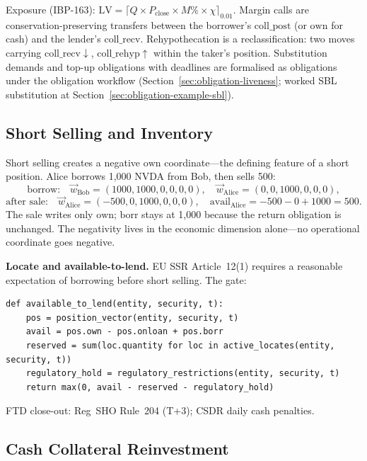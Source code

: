 Exposure (IBP-163): $\mathrm{LV} = \lceil Q\times P_{\mathrm{close}}\times M\%\times\chi\rceil_{0.01}$. Margin calls are conservation-preserving transfers between the borrower's $\mathrm{coll\_post}$ (or $\mathrm{own}$ for cash) and the lender's $\mathrm{coll\_recv}$. Rehypothecation is a reclassification: two moves carrying $\mathrm{coll\_recv}\downarrow$, $\mathrm{coll\_rehyp}\uparrow$ within the taker's position. Substitution demands and top-up obligations with deadlines are formalised as obligations under the obligation workflow (Section~\ref{sec:obligation-liveness}; worked SBL substitution at Section~\ref{sec:obligation-example-sbl}).

\subsection{Short Selling and Inventory}
\label{sec:sbl-short-selling}

Short selling creates a negative $\mathrm{own}$ coordinate---the defining feature of a short position. Alice borrows 1{,}000 NVDA from Bob, then sells 500:
\[
\text{borrow:}\quad \vec{w}_{\mathrm{Bob}} = (1000,1000,0,0,0,0),\quad \vec{w}_{\mathrm{Alice}} = (0,0,1000,0,0,0),
\]
\[
\text{after sale:}\quad \vec{w}_{\mathrm{Alice}} = (-500,0,1000,0,0,0),\quad \mathrm{avail}_{\mathrm{Alice}} = -500-0+1000 = 500.
\]
The sale writes only $\mathrm{own}$; $\mathrm{borr}$ stays at 1{,}000 because the return obligation is unchanged. The negativity lives in the economic dimension alone---no operational coordinate goes negative.

\noindent\textbf{Locate and available-to-lend.} EU SSR Article~12(1) requires a reasonable expectation of borrowing before short selling. The gate:
\begin{lstlisting}
def available_to_lend(entity, security, t):
    pos = position_vector(entity, security, t)
    avail = pos.own - pos.onloan + pos.borr
    reserved = sum(loc.quantity for loc in active_locates(entity, security, t))
    regulatory_hold = regulatory_restrictions(entity, security, t)
    return max(0, avail - reserved - regulatory_hold)
\end{lstlisting}
FTD close-out: Reg~SHO Rule~204 (T+3); CSDR daily cash penalties.

\subsection{Cash Collateral Reinvestment}
\label{sec:sbl-reinvestment}

